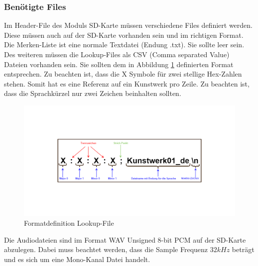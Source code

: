 \subsubsection{Benötigte Files}
Im Header-File des Moduls SD-Karte müssen verschiedene Files definiert werden. Diese müssen auch auf der SD-Karte vorhanden sein und im richtigen Format. Die Merken-Liste ist eine normale Textdatei (Endung .txt). Sie sollte leer sein. Des weiteren müssen die Lookup-Files als CSV (Comma separated Value) Dateien vorhanden sein. Sie sollten dem in Abbildung \ref{fig:definition_lookup_file} definierten Format entsprechen. Zu beachten ist, dass die X Symbole für zwei stellige Hex-Zahlen stehen. Somit hat es eine Referenz auf ein Kunstwerk pro Zeile. Zu beachten ist, dass die Sprachkürzel nur zwei Zeichen beinhalten sollten.

\begin{figure}[H]
	\begin{center}
		\includegraphics[width=140mm]{data/Definition_picture.png}
		\caption[Formatdefinition Lookup-File]{Formatdefinition Lookup-File} %
		\label{fig:definition_lookup_file}
	\end{center}
\end{figure}

Die Audiodateien sind im Format WAV Unsigned 8-bit PCM auf der SD-Karte abzulegen. Dabei muss beachtet werden, dass die Sample Frequenz $32 kHz$ beträgt und es sich um eine Mono-Kanal Datei handelt. 
